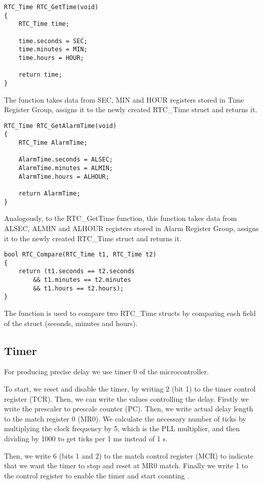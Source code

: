 \documentclass[10pt]{article}
\begin{document}
	\begin{lstlisting}[caption = {Getting time from the register function}]
RTC_Time RTC_GetTime(void)
{
	RTC_Time time;

	time.seconds = SEC;
	time.minutes = MIN;
	time.hours = HOUR;

	return time;
}
	\end{lstlisting}
	The function takes data from SEC, MIN and HOUR registers stored in Time Register Group, assigns it to the newly created RTC\_Time struct and returns it.

	\begin{lstlisting}[caption = {Getting alarm time from the register function}]
RTC_Time RTC_GetAlarmTime(void)
{
	RTC_Time AlarmTime;

	AlarmTime.seconds = ALSEC;
	AlarmTime.minutes = ALMIN;
	AlarmTime.hours = ALHOUR;

	return AlarmTime;
}
	\end{lstlisting}
	Analogously, to the RTC\_GetTime function, this function takes data from ALSEC, ALMIN and ALHOUR registers stored in Alarm Register Group, assigns it to the newly created RTC\_Time struct and returns it.

	\begin{lstlisting}[caption = {RTC\_Time struct comparator function}]
bool RTC_Compare(RTC_Time t1, RTC_Time t2)
{
	return (t1.seconds == t2.seconds
		&& t1.minutes == t2.minutes
		&& t1.hours == t2.hours);
}
	\end{lstlisting}
	The function is used to compare two RTC\_Time structs by comparing each field of the struct (seconds, minutes and hours).

    \subsection{Timer}

    For producing precise delay we use timer 0 of the microcontroller.
    
    To start, we reset and disable the timer, by writing $2$ (bit 1) to the timer control register (TCR). 
    Then, we can write the values controlling the delay.
    Firstly we write the prescaler to prescale counter (PC).
    Then, we write actual delay length to the match register 0 (MR0).
    We calculate the necessary number of ticks by multiplying the clock frequency by 5, which is the PLL multiplier, and then dividing by 1000 to get ticks per 1 ms instead of 1 s.

    Then, we write 6 (bits 1 and 2) to the match control register (MCR) to indicate that we want the timer to stop and reset at MR0 match.
    Finally we write 1 to the control register to enable the timer and start counting \cite[p.251]{lpc2148-manual}.
\end{document}

